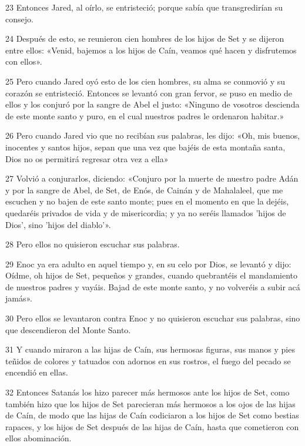 \par 23 Entonces Jared, al oírlo, se entristeció; porque sabía que transgredirían su consejo.

\par 24 Después de esto, se reunieron cien hombres de los hijos de Set y se dijeron entre ellos: «Venid, bajemos a los hijos de Caín, veamos qué hacen y disfrutemos con ellos».

\par 25 Pero cuando Jared oyó esto de los cien hombres, su alma se conmovió y su corazón se entristeció. Entonces se levantó con gran fervor, se puso en medio de ellos y los conjuró por la sangre de Abel el justo: «Ninguno de vosotros descienda de este monte santo y puro, en el cual nuestros padres le ordenaron habitar.»

\par 26 Pero cuando Jared vio que no recibían sus palabras, les dijo: «Oh, mis buenos, inocentes y santos hijos, sepan que una vez que bajéis de esta montaña santa, Dios no os permitirá regresar otra vez a ella»

\par 27 Volvió a conjurarlos, diciendo: «Conjuro por la muerte de nuestro padre Adán y por la sangre de Abel, de Set, de Enós, de Cainán y de Mahalaleel, que me escuchen y no bajen de este santo monte; pues en el momento en que la dejéis, quedaréis privados de vida y de misericordia; y ya no seréis llamados 'hijos de Dios', sino 'hijos del diablo'».

\par 28 Pero ellos no quisieron escuchar sus palabras.

\par 29 Enoc ya era adulto en aquel tiempo y, en su celo por Dios, se levantó y dijo: Oídme, oh hijos de Set, pequeños y grandes, cuando quebrantéis el mandamiento de nuestros padres y vayáis. Bajad de este monte santo, y no volveréis a subir acá jamás».

\par 30 Pero ellos se levantaron contra Enoc y no quisieron escuchar sus palabras, sino que descendieron del Monte Santo.

\par 31 Y cuando miraron a las hijas de Caín, sus hermosas figuras, sus manos y pies teñidos de colores y tatuados con adornos en sus rostros, el fuego del pecado se encendió en ellas.

\par 32 Entonces Satanás los hizo parecer más hermosos ante los hijos de Set, como también hizo que los hijos de Set parecieran más hermosos a los ojos de las hijas de Caín, de modo que las hijas de Caín codiciaron a los hijos de Set como bestias rapaces, y los hijos de Set después de las hijas de Caín, hasta que cometieron con ellos abominación.

